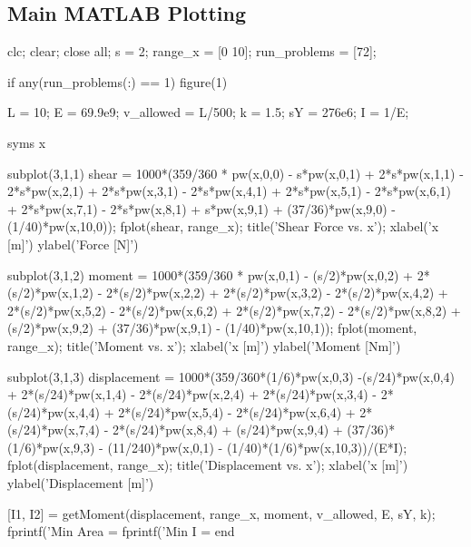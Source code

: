 \documentclass[a4paper]{article}
\begin{document}
\subsection{Main MATLAB Plotting}
\begin{verbatim*}

clc; clear; close all;
s = 2;
range_x = [0 10];
run_problems = [72];


if any(run_problems(:) == 1)
    figure(1)

    L = 10; %
    E = 69.9e9; %
    v_allowed = L/500; %
    k = 1.5; %
    sY = 276e6; %
    I = 1/E;

    syms x

    subplot(3,1,1)
    shear = 1000*(359/360 * pw(x,0,0) - s*pw(x,0,1) + 2*s*pw(x,1,1) - 2*s*pw(x,2,1) + 2*s*pw(x,3,1) - 2*s*pw(x,4,1) + 2*s*pw(x,5,1) - 2*s*pw(x,6,1) + 2*s*pw(x,7,1) - 2*s*pw(x,8,1) + s*pw(x,9,1) + (37/36)*pw(x,9,0) - (1/40)*pw(x,10,0));
    fplot(shear, range_x);
    title('Shear Force vs. x');
    xlabel('x [m]')
    ylabel('Force [N]')

    subplot(3,1,2)
    moment = 1000*(359/360 * pw(x,0,1) - (s/2)*pw(x,0,2) + 2*(s/2)*pw(x,1,2) - 2*(s/2)*pw(x,2,2) + 2*(s/2)*pw(x,3,2) - 2*(s/2)*pw(x,4,2) + 2*(s/2)*pw(x,5,2) - 2*(s/2)*pw(x,6,2) + 2*(s/2)*pw(x,7,2) - 2*(s/2)*pw(x,8,2) + (s/2)*pw(x,9,2) + (37/36)*pw(x,9,1) - (1/40)*pw(x,10,1));
    fplot(moment, range_x);
    title('Moment vs. x');
    xlabel('x [m]')
    ylabel('Moment [Nm]')

    subplot(3,1,3)
    displacement = 1000*(359/360*(1/6)*pw(x,0,3) -(s/24)*pw(x,0,4) + 2*(s/24)*pw(x,1,4) - 2*(s/24)*pw(x,2,4) + 2*(s/24)*pw(x,3,4) - 2*(s/24)*pw(x,4,4) + 2*(s/24)*pw(x,5,4) - 2*(s/24)*pw(x,6,4) + 2*(s/24)*pw(x,7,4) - 2*(s/24)*pw(x,8,4) + (s/24)*pw(x,9,4) + (37/36)*(1/6)*pw(x,9,3) - (11/240)*pw(x,0,1) - (1/40)*(1/6)*pw(x,10,3))/(E*I);
    fplot(displacement, range_x);
    title('Displacement vs. x');
    xlabel('x [m]')
    ylabel('Displacement [m]')


    [I1, I2] = getMoment(displacement, range_x, moment, v_allowed, E, sY, k);
    fprintf('Min Area = %
    fprintf('Min I = %
end




\end{verbatim*}
\end{document}
